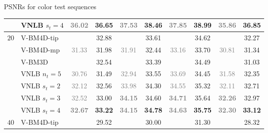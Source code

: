 \documentclass[mathserif, 8pt]{beamer}
\newcommand{\best}[1]{#1}
\newcommand{\bsic}[1]{\textcolor{gray}{#1}}
\newcommand{\Bsic}[1]{\textcolor{gray}{\textbf{#1}}}
\newcommand{\Best}[1]{\textbf{\textcolor{MyOrangeBrighter}{#1}}}
\begin{document}
\begin{frame}{PSNRs for color test sequences}
\begin{center}
{\begin{tabular}{ c | l |c c | c c | c c | c c}
			                      & VNLB   $s_t = 4$     & \Bsic{36.02} & \Best{36.65} & \Bsic{37.53} & \Best{38.46} & \Bsic{37.85} & \Best{38.99} & \Bsic{35.86} & \Best{36.85} \\\hline
%
			\multirow{5}{*}{$20$} & V-BM4D-tip           & \bsic{     } & \best{32.88} & \bsic{     } & \best{33.61} & \bsic{     } & \best{34.62} & \bsic{     } & \best{32.27} \\
			                      & V-BM4D-mp            & \bsic{31.33} &       31.98  & \bsic{31.91} &       32.44  & \bsic{33.16} &       33.70  & \bsic{30.81} &       31.34  \\
			                      & V-BM3D               & \bsic{     } &       32.54  & \bsic{     } &       33.39  & \bsic{     } &       34.49  & \bsic{     } &       31.03  \\
			                      & VNLB $n_t = 5$       & \bsic{30.76} &       31.49  & \bsic{32.94} & \best{33.55} & \bsic{33.69} &       34.45  & \bsic{31.58} & \best{32.35} \\
			                      & VNLB   $s_t = 2$     & \bsic{32.12} &       32.56  & \bsic{33.98} &       34.30  & \bsic{34.55} &       35.32  & \bsic{32.11} &       32.71  \\
			                      & VNLB   $s_t = 3$     & \bsic{32.52} &       33.00  & \Bsic{34.15} &       34.60  & \Bsic{34.71} &       35.64  & \Bsic{32.26} &       32.97  \\
			                      & VNLB   $s_t = 4$     & \Bsic{32.67} & \Best{33.22} & \Bsic{34.15} & \Best{34.78} & \Bsic{34.63} & \Best{35.75} & \Bsic{32.30} & \Best{33.12} \\\hline
%
			\multirow{5}{*}{$40$} & V-BM4D-tip           & \bsic{     } & \best{29.52} & \bsic{     } & \best{30.00} & \bsic{     } & \best{31.30} & \bsic{     } &       28.32  \\

\end{tabular}}
\end{center}
\end{frame}
\end{document}
